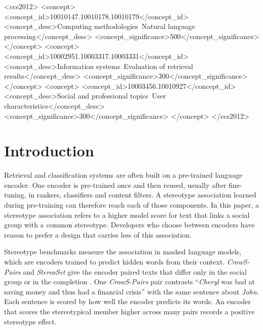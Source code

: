 \documentclass[sigconf,natbib=true]{acmart}
\begin{document}
\begin{CCSXML}
<ccs2012>
<concept>
<concept_id>10010147.10010178.10010179</concept_id>
<concept_desc>Computing methodologies~Natural language processing</concept_desc>
<concept_significance>500</concept_significance>
</concept>
<concept>
<concept_id>10002951.10003317.10003331</concept_id>
<concept_desc>Information systems~Evaluation of retrieval results</concept_desc>
<concept_significance>300</concept_significance>
</concept>
<concept>
<concept_id>10003456.10010927</concept_id>
<concept_desc>Social and professional topics~User characteristics</concept_desc>
<concept_significance>300</concept_significance>
</concept>
</ccs2012>
\end{CCSXML}



\maketitle

\section{Introduction}
\label{sec:intro}

Retrieval and classification systems are often built on a pre-trained language
encoder. One encoder is pre-trained once and then reused, usually after
fine-tuning, in rankers, classifiers and content filters. A stereotype
association learned during pre-training can therefore reach each of those
components. In this paper, a stereotype association refers to a higher model
score for text that links a social group with a common stereotype. Developers
who choose between encoders have reason to prefer a design that carries less of
this association.

Stereotype benchmarks measure the association in masked language models, which
are encoders trained to predict hidden words from their context.
\emph{CrowS-Pairs} and \emph{StereoSet} give the encoder paired texts that differ
only in the social group or in the completion
\citep{nangia2020crows,nadeem2021stereoset}. One \emph{CrowS-Pairs} pair
contrasts ``\emph{Cheryl} was bad at saving money and thus had a financial
crisis'' with the same sentence about \emph{John}. Each sentence is scored by how
well the encoder predicts its words. An encoder that scores the stereotypical
member higher across many pairs records a positive stereotype effect.
\end{document}
